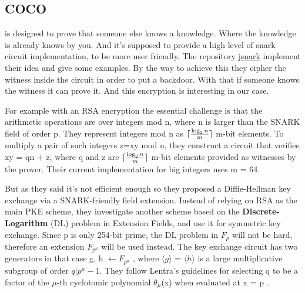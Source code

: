 \subsection{COCO}
\label{sec:COCO}
\cite{coco} is designed to prove that someone else knows a knowledge. Where the knowledge is already knows by you. And it's supposed to provide a high level of snark circuit implementation, to be more user friendly. The repository \href{https://github.com/akosba/jsnark}{jsnark} implement their idea and give some examples. By the way to achieve this they cipher the witness inside the circuit in order to put a backdoor. With that if someone knows the witness it can prove it. And this encryption is interesting in our case. 

For example with an RSA encryption the essential challenge is that the arithmetic operations are over integers mod n, where n is larger than the SNARK field of order p. They represent integers mod n as $\lceil\frac{\log_2 n}{m}\rceil$ m-bit elements. To multiply a pair of such integers z=xy mod n, they construct a circuit that verifies xy = qn + z, where q and z are $\lceil\frac{\log_2 n}{m}\rceil$ m-bit elements provided as witnesses by the prover. Their current implementation for big integers uses m = 64.

But as they said it's not efficient enough so they proposed a Diffie-Hellman key exchange via a SNARK-friendly field extension. Instead of relying on RSA as the main PKE scheme, they investigate another scheme based on the \textbf{Discrete-Logarithm} (DL) problem in Extension Fields, and use it for symmetric key exchange. Since p is only 254-bit prime, the DL problem in $F_p$ will not be hard, therefore an extension $F_{p^\mu }$ will be used instead. The key exchange circuit has two generators in that case g, h $\leftarrow F_{p^\mu}$ , where $\langle g\rangle$ = $\langle h \rangle$ is a large multiplicative subgroup of order $q|{p^\mu} -1 $. They follow Lentra’s guidelines for selecting q to be a factor of the $\mu$-th cyclotomic polynomial $\theta_\mu$(x) when evaluated at x = p  \cite{lenstra_guide}.